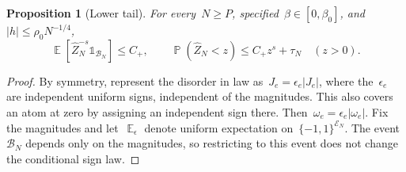 \documentclass[letterpaper,11pt,reqno]{amsart}
\renewcommand{\leq}{\leqslant}
\renewcommand{\geq}{\geqslant}
\newcommand{\ind}{\mathds{1}}
\DeclareMathOperator{\E}{\mathds{E}}
\DeclareMathOperator{\pr}{\mathds{P}}
\newtheorem{proposition}[theorem]{Proposition}
\begin{document}
\begin{proposition}[Lower tail]\label{prop:lower-tail}
For every~$N\geq P$, specified~$\beta\in[0,\beta_0]$, and~$|h|\leq\rho_0N^{-1/4}$,
\begin{equation}\label{eq:lower-tail}
\E[\widehat Z_N^{-s}\ind_{\mathcal B_N}]\leq C_+,
\qquad \pr(\widehat Z_N<z)\leq C_+z^s+\tau_N\quad(z>0).
\end{equation}
\end{proposition}
\begin{proof}
By symmetry, represent the disorder in law as~$J_e=\epsilon_e|J_e|$, where the~$\epsilon_e$ are independent uniform signs, independent of the magnitudes. This also covers an atom at zero by assigning an independent sign there. Then~$\omega_e=\epsilon_e|\omega_e|$. Fix the magnitudes and let~$\E_\epsilon$ denote uniform expectation on~$\{-1,1\}^{\mathcal E_N}$. The event~$\mathcal B_N$ depends only on the magnitudes, so restricting to this event does not change the conditional sign law.


\end{proof}
\end{document}
